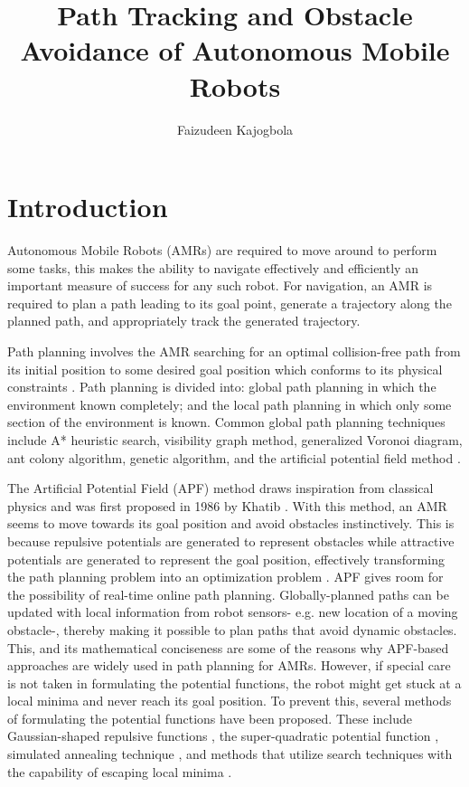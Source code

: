 \documentclass[a4paper, twocolumn]{article}
\title{\Huge{Path Tracking and Obstacle Avoidance of Autonomous Mobile Robots}}
\author{Faizudeen Kajogbola}
\date{} %
\begin{document}

\maketitle

\setlength{\headsep}{5pt}
\setlength{\voffset}{-0.75in}   %

\section{Introduction}

Autonomous Mobile Robots (AMRs) are required to move around to perform some tasks, 
this makes the ability to navigate effectively and efficiently an important measure of success for any such robot.
For navigation, an AMR is required to plan a path leading to its goal point, 
generate a trajectory along the planned path, and appropriately track the generated trajectory.

Path planning involves the AMR searching for an optimal collision-free path from its initial position to some 
desired goal position which conforms to its physical constraints \cite{cai1}.
Path planning is divided into: global path planning in which the environment known completely; 
and the local path planning in which only some section of the environment is known.
Common global path planning techniques include A* heuristic search, visibility graph method, generalized Voronoi diagram, 
ant colony algorithm, genetic algorithm, and the artificial potential field method \cite{kunchev1, shi1}.

The Artificial Potential Field (APF) method draws inspiration from classical physics and was first proposed in 1986 by Khatib \cite{khatib1}.
With this method, an AMR seems to move towards its goal position and avoid obstacles instinctively. 
This is because repulsive potentials are generated to represent obstacles while attractive potentials are 
generated to represent the goal position, effectively transforming the path planning problem into an 
optimization problem \cite{ji1}.
APF gives room for the possibility of real-time online path planning. 
Globally-planned paths can be updated with local information from robot sensors- 
e.g. new location of a moving obstacle-, thereby making it possible to plan paths that avoid dynamic obstacles.
This, and its mathematical conciseness \cite{shi1} are some of the reasons why APF-based approaches 
are widely used in path planning for AMRs.
However, if special care is not taken in formulating the potential functions, the robot might get stuck at 
a local minima and never reach its goal position.
To prevent this, several methods of formulating the potential functions have been proposed. 
These include Gaussian-shaped repulsive functions \cite{koditschek1}, the super-quadratic potential function \cite{volpe1}, 
simulated annealing technique \cite{zhu1}, and methods that utilize search techniques with the capability of escaping local minima \cite{barraquand1}.
\end{document}
